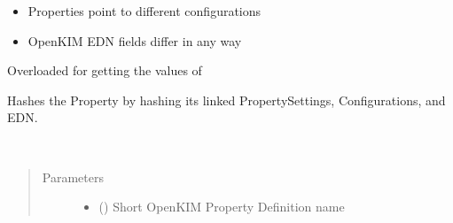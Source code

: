 \documentclass[letterpaper,10pt,english]{sphinxmanual}
\begin{document}
\begin{fulllineitems}
\begin{fulllineitems}
\begin{itemize}
\item {} 
\sphinxAtStartPar
Properties point to different configurations

\item {} 
\sphinxAtStartPar
OpenKIM EDN fields differ in any way

\end{itemize}

\end{fulllineitems}


\begin{fulllineitems}
\label{\detokenize{property:colabfit.tools.property.Property.__getitem__}}
\sphinxAtStartPar
Overloaded  for getting the values of 

\end{fulllineitems}


\begin{fulllineitems}
\label{\detokenize{property:colabfit.tools.property.Property.__hash__}}
\sphinxAtStartPar
Hashes the Property by hashing its linked PropertySettings,
Configurations, and EDN.

\end{fulllineitems}


\begin{fulllineitems}
\label{\detokenize{property:colabfit.tools.property.Property.__init__}}~\begin{quote}\begin{description}
\item[{Parameters}] \leavevmode\begin{itemize}
\item {} 
\sphinxAtStartPar
{} () \textendash{} Short OpenKIM Property Definition name


\end{itemize}
\end{description}
\end{quote}
\end{fulllineitems}
\end{fulllineitems}
\end{document}
